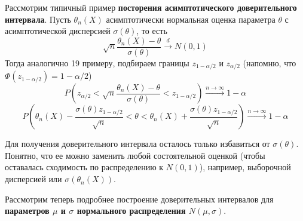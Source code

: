 \begin{example}
Рассмотрим типичный пример \textbf{посторения асимптотического доверительного интервала}. Пусть $\theta_n\left(X\right)$ асимптотически нормальная оценка параметра $\theta$ с асимптотической дисперсией $\sigma\left(\theta\right)$, то есть 
\[
    \sqrt{n} \frac{\theta_n\left(X\right) - \theta}{\sigma\left(\theta\right)} \xrightarrow{d} N\left(0, 1\right)
\]
Тогда аналогично 19 примеру, подбираем границы $z_{1-\alpha/2}$ и $z_{\alpha/2}$ (напомню, что $\Phi\left(z_{1-\alpha/2}\right) = 1 - \alpha/2$)
\[
    P\left(z_{\alpha/2} < \sqrt{n} \frac{\theta_n\left(X\right) - \theta}{\sigma\left(\theta\right)} < z_{1-\alpha/2}\right) \xrightarrow{n \to \infty} 1 - \alpha
\]\[
    P\left(\theta_n\left(X\right) - \frac{\sigma\left(\theta\right)z_{1-\alpha/2}}{\sqrt{n}} < \theta < \theta_n\left(X\right) + \frac{\sigma\left(\theta\right)z_{1-\alpha/2}}{\sqrt{n}}\right)\xrightarrow{n \to \infty} 1 - \alpha
\]

Для получения доверительного интервала осталось только избавиться от $\sigma{\left(\theta\right)}$. Понятно, что ее можно заменить любой состоятельной оценкой (чтобы оставалась сходимость по распределению к $N\left(0, 1\right)$), например, выборочной дисперсией или $\sigma\left(\theta_n\left(X\right)\right)$.
\end{example}

\par 
Рассмотрим теперь подробнее построение доверительных интервалов для \textbf{параметров $\mu$ и $\sigma$ нормального распределения $N\left(\mu, \sigma\right)$}.

